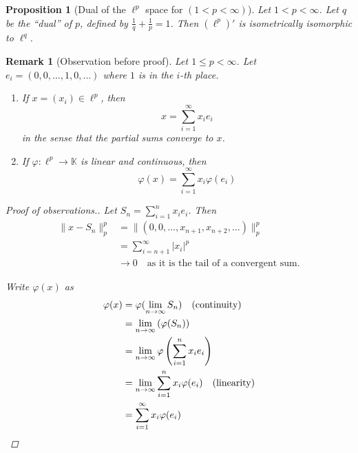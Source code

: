 \documentclass[12pt, oneside, a4paper]{article}
\newtheorem{prop}[thm]{Proposition}
\theoremstyle{dfn}
\newtheorem{rem}[thm]{Remark}
\renewcommand{\phi}{\varphi}
\newcommand{\K}{\mathbb{K}}
\begin{document}
\begin{prop}[Dual of the $\ell^p$ space for $(1 < p < \infty)$]
    Let $1 < p < \infty$.  Let $q$ be the ``dual'' of $p$, defined by $\frac{1}{q} + \frac{1}{p} = 1$.  Then $(\ell^p)'$ is isometrically isomorphic to $\ell^q$.  
\end{prop}
\begin{rem}[Observation before proof]
    Let $1 \leq p < \infty$.  Let $e_i = (0,0,\dots, 1, 0, \dots)$ where $1$ is in the $i$-th place.  
\begin{enumerate}[1)]
        \item If $x = (x_i) \in \ell^p$, then \[
            x = \sum_{i=1}^\infty x_i e_i
        \] in the sense that the partial sums converge to $x$.
        \item If $\phi : \ell^p \rightarrow \K$ is linear and continuous, then \[
            \phi(x) = \sum_{i = 1}^\infty x_i \phi(e_i)
        \]
\end{enumerate}

\begin{proof}[Proof of observations.]
    Let $S_n = \sum_{i=1}^n x_i e_i$.  Then \begin{align*}
        \| x - S_n \|_p^p &= \| (0,0,\dots, x_{n+1}, x_{n+2}, \dots) \|_p^p \\
        &= \sum_{i=n+1}^\infty |x_i|^p \\
        &\rightarrow 0 \quad \text{as it is the tail of a convergent sum.}
    \end{align*}
    
    Write $\phi(x)$ as \begin{align*}
        \phi(x) &= \phi( \lim_{n \rightarrow \infty} S_n)  \quad \text{(continuity)}\\
                &= \lim_{n \rightarrow \infty} \left( \phi(S_n ) \right) \\
                &= \lim_{n \rightarrow \infty} \phi \left( \sum_{i=1}^n x_i e_i \right) \\
                &= \lim_{n \rightarrow \infty} \sum_{i=1}^n x_i \phi(e_i) \quad \text{(linearity)}  \\
                &= \sum_{i=1}^\infty x_i \phi(e_i) \qedhere
    \end{align*}
\end{proof}
\end{rem}
\end{document}
